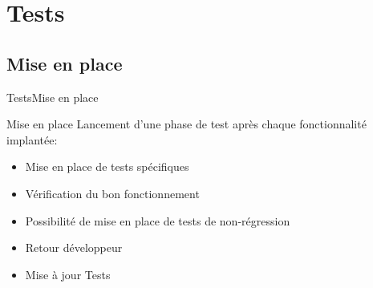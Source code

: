 \section{Tests}

   \subsection{Mise en place}
      \begin{frame}{Tests}{Mise en place}
        \begin{block}{Mise en place}
          Lancement d'une phase de test après chaque fonctionnalité implantée:
          \begin{itemize}
            \item<1-> Mise en place de tests spécifiques
            \item<2-> Vérification du bon fonctionnement
            \item<3-> Possibilité de mise en place de tests de non-régression
            \item<4-> Retour développeur
            \item<5-> Mise à jour Tests
          \end{itemize}
        \end{block}
      \end{frame}
